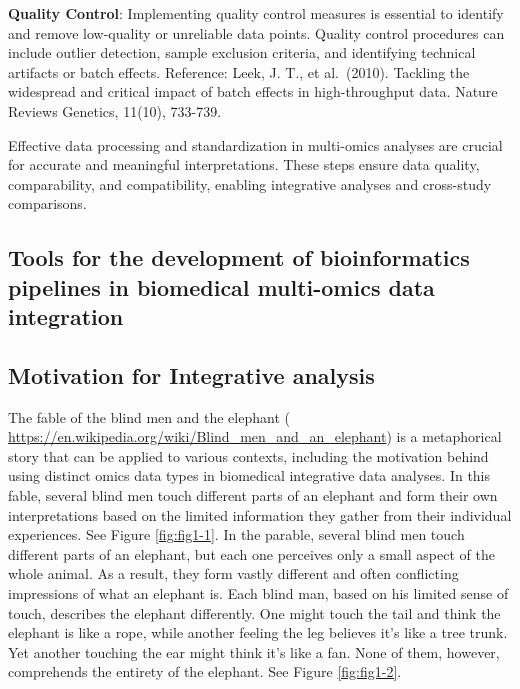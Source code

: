 \documentclass[a4paper, nobind]{templates/ociamthesis}
\begin{document}
\textbf{Quality Control}: Implementing quality control measures is essential to identify and remove low-quality or unreliable data points. Quality control procedures can include outlier detection, sample exclusion criteria, and identifying technical artifacts or batch effects. Reference: Leek, J. T., et al.~(2010). Tackling the widespread and critical impact of batch effects in high-throughput data. Nature Reviews Genetics, 11(10), 733-739.

Effective data processing and standardization in multi-omics analyses are crucial for accurate and meaningful interpretations. These steps ensure data quality, comparability, and compatibility, enabling integrative analyses and cross-study comparisons.

\hypertarget{tools-for-the-development-of-bioinformatics-pipelines-in-biomedical-multi-omics-data-integration}{%
\subsection{Tools for the development of bioinformatics pipelines in biomedical multi-omics data integration}\label{tools-for-the-development-of-bioinformatics-pipelines-in-biomedical-multi-omics-data-integration}}

\hypertarget{motivation-for-integrative-analysis}{%
\subsection{Motivation for Integrative analysis}\label{motivation-for-integrative-analysis}}

The fable of the blind men and the elephant ( \url{https://en.wikipedia.org/wiki/Blind_men_and_an_elephant}) is a metaphorical story that can be applied to various contexts, including the motivation behind using distinct omics data types in biomedical integrative data analyses. In this fable, several blind men touch different parts of an elephant and form their own interpretations based on the limited information they gather from their individual experiences. See Figure \ref{fig:fig1-1}. In the parable, several blind men touch different parts of an elephant, but each one perceives only a small aspect of the whole animal. As a result, they form vastly different and often conflicting impressions of what an elephant is. Each blind man, based on his limited sense of touch, describes the elephant differently. One might touch the tail and think the elephant is like a rope, while another feeling the leg believes it's like a tree trunk. Yet another touching the ear might think it's like a fan. None of them, however, comprehends the entirety of the elephant. See Figure \ref{fig:fig1-2}.
\end{document}
